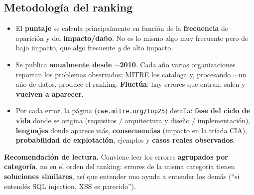 \documentclass[11pt,a4paper]{article}
\begin{document}
\subsection{Metodología del ranking}
\begin{itemize}[leftmargin=1.4em,itemsep=1pt]
  \item El \textbf{puntaje} se calcula principalmente en función de la \textbf{frecuencia} de
        aparición y del \textbf{impacto/daño}. No es lo mismo algo muy frecuente pero de bajo
        impacto, que algo frecuente \emph{y} de alto impacto.
  \item Se publica \textbf{anualmente desde $\sim$2010}. Cada año varias organizaciones reportan
        los problemas observados; MITRE los cataloga y, procesando $\sim$un año de datos, produce
        el ranking. \textbf{Fluctúa}: hay errores que entran, salen y \textbf{vuelven a aparecer}.
  \item Por cada error, la página
        (\href{http://cwe.mitre.org/top25}{\texttt{cwe.mitre.org/top25}}) detalla: \textbf{fase
        del ciclo de vida} donde se origina (requisitos / arquitectura y diseño / implementación),
        \textbf{lenguajes} donde aparece más, \textbf{consecuencias} (impacto en la tríada CIA),
        \textbf{probabilidad de explotación}, ejemplos y \textbf{casos reales observados}.
\end{itemize}

\begin{slidebox}
\textbf{Recomendación de lectura.} Conviene leer los errores \textbf{agrupados por categoría},
no en el orden del ranking: errores de la misma categoría tienen \textbf{soluciones similares},
así que entender uno ayuda a entender los demás (``si entendés SQL injection, XSS es parecido'').
\end{slidebox}
\end{document}
